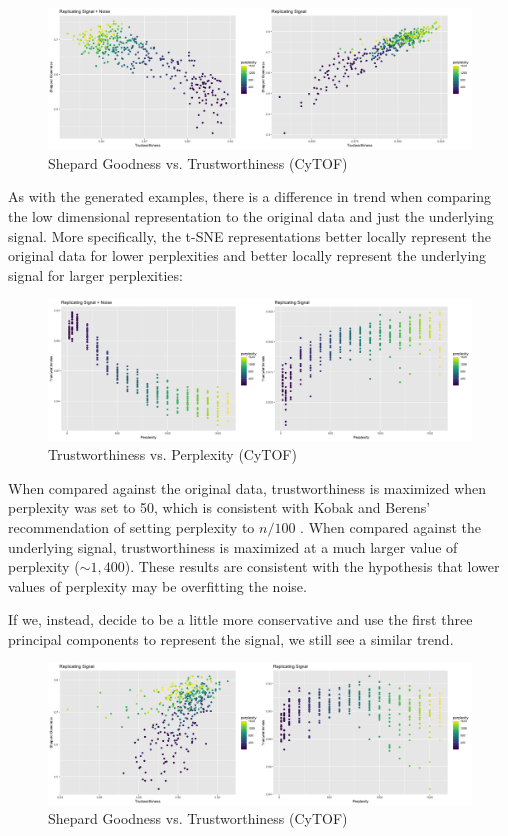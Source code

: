 \documentclass{article}
\begin{document}
\begin{figure}[H]
\includegraphics[scale=0.25]{CyTOF plot}
\centering
\caption{Shepard Goodness vs. Trustworthiness (CyTOF)}
\end{figure}

As with the generated examples, there is a difference in trend when comparing the low dimensional representation to the original data and just the underlying signal. More specifically, the t-SNE representations better locally represent the original data for lower perplexities and better locally represent the underlying signal for larger perplexities:

\begin{figure}[H]
\includegraphics[scale=0.25]{trust plot (CyTOF)}
\centering
\caption{Trustworthiness vs. Perplexity (CyTOF)}
\end{figure}

When compared against the original data, trustworthiness is maximized when perplexity was set to 50, which is consistent with Kobak and Berens' recommendation of setting perplexity to $n/100$ \cite{t-SNE cell}. When compared against the underlying signal, trustworthiness is maximized at a much larger value of perplexity ($\sim 1,400$). These results are consistent with the hypothesis that lower values of perplexity may be overfitting the noise.

\bigbreak If we, instead, decide to be a little more conservative and use the first three principal components to represent the signal, we still see a similar trend.

\begin{figure}[H]
\includegraphics[scale=0.25]{3 dim plot (CyTOF)}
\centering
\caption{Shepard Goodness vs. Trustworthiness (CyTOF)}
\end{figure}
\end{document}
